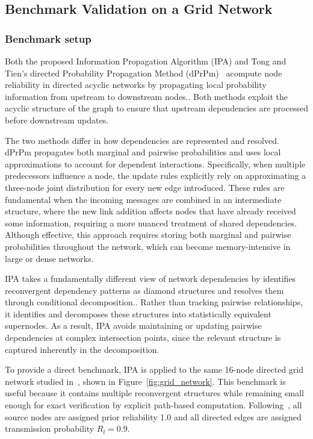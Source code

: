 \documentclass[preprint,12pt]{elsarticle}
\begin{document}
\subsection{Benchmark Validation on a Grid Network}

\subsubsection{Benchmark setup}
Both the proposed Information Propagation Algorithm (IPA) and Tong and Tien's directed Probability Propagation Method (dPrPm)~\cite{tong_probability_2019} acompute node reliability in directed acyclic networks by propagating local probability information from upstream to downstream nodes.. Both methods exploit the acyclic structure of the graph to ensure that upstream dependencies are processed before downstream updates.

The two methods differ in how dependencies are represented and resolved. dPrPm propagates both marginal and pairwise probabilities and uses local approximations to account for dependent interactions. Specifically, when multiple predecessors influence a node, the update rules explicitly rely on approximating a three-node joint distribution for every new edge introduced. These rules are fundamental when the incoming messages are combined in an intermediate structure, where the new link addition affects nodes that have already received some information, requiring a more nuanced treatment of shared dependencies. Although effective, this approach requires storing both marginal and pairwise probabilities throughout the network, which can become memory-intensive in large or dense networks.

IPA takes a fundamentally different view of network dependencies by identifies reconvergent dependency patterns as diamond structures and resolves them through conditional decomposition.. Rather than tracking pairwise relationships, it identifies and decomposes these structures into statistically equivalent supernodes.  As a result, IPA avoids maintaining or updating pairwise dependencies at complex intersection points, since the relevant structure is captured inherently in the decomposition.

To provide a direct benchmark, IPA is applied to the same 16-node directed grid network studied in~\cite{tong_probability_2019}, shown in Figure~\ref{fig:grid_network}. This benchmark is useful because it contains multiple reconvergent structures while remaining small enough for exact verification by explicit path-based computation. Following~\cite{tong_probability_2019}, all source nodes are assigned prior reliability 1.0 and all directed edges are assigned transmission probability $R_l = 0.9$.
\end{document}
